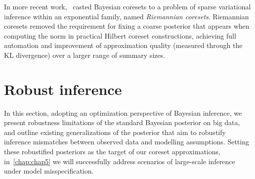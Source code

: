 In more recent work,~ casted Bayesian coresets to a problem of sparse variational inference within an exponential family, named \emph{Riemannian coresets}. Riemannian coresets removed the requirement for fixing a coarse posterior that appears when computing the norm in practical Hilbert coreset constructions, achieving full automation and improvement of approximation quality (measured through the KL divergence) over a larger range of summary sizes.


\section{Robust inference}
\label{sec:brobust-inference}

In this section, adopting an optimization perspective of Bayesian inference, we present robustness limitations of the standard Bayesian posterior on big data, and outline existing generalizations of the posterior that aim to robustify inference \wrt mismatches between observed data and modelling assumptions. Setting these robustified posteriors as the target of our coreset approximations, in~\cref{chap:chap5} we will successfully address scenarios of large-scale inference under model misspecification.

